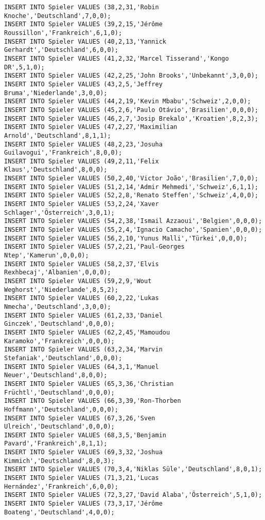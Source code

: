 \documentclass{bschlangaul-aufgabe}
\begin{document}
\begin{verbatim}
INSERT INTO Spieler VALUES (38,2,31,'Robin Knoche','Deutschland',7,0,0);
INSERT INTO Spieler VALUES (39,2,15,'Jérôme Roussillon','Frankreich',6,1,0);
INSERT INTO Spieler VALUES (40,2,13,'Yannick Gerhardt','Deutschland',6,0,0);
INSERT INTO Spieler VALUES (41,2,32,'Marcel Tisserand','Kongo DR',5,1,0);
INSERT INTO Spieler VALUES (42,2,25,'John Brooks','Unbekannt',3,0,0);
INSERT INTO Spieler VALUES (43,2,5,'Jeffrey Bruma','Niederlande',3,0,0);
INSERT INTO Spieler VALUES (44,2,19,'Kevin Mbabu','Schweiz',2,0,0);
INSERT INTO Spieler VALUES (45,2,6,'Paulo Otávio','Brasilien',0,0,0);
INSERT INTO Spieler VALUES (46,2,7,'Josip Brekalo','Kroatien',8,2,3);
INSERT INTO Spieler VALUES (47,2,27,'Maximilian Arnold','Deutschland',8,1,1);
INSERT INTO Spieler VALUES (48,2,23,'Josuha Guilavogui','Frankreich',8,0,0);
INSERT INTO Spieler VALUES (49,2,11,'Felix Klaus','Deutschland',8,0,0);
INSERT INTO Spieler VALUES (50,2,40,'Victor João','Brasilien',7,0,0);
INSERT INTO Spieler VALUES (51,2,14,'Admir Mehmedi','Schweiz',6,1,1);
INSERT INTO Spieler VALUES (52,2,8,'Renato Steffen','Schweiz',4,0,0);
INSERT INTO Spieler VALUES (53,2,24,'Xaver Schlager','Österreich',3,0,1);
INSERT INTO Spieler VALUES (54,2,38,'Ismail Azzaoui','Belgien',0,0,0);
INSERT INTO Spieler VALUES (55,2,4,'Ignacio Camacho','Spanien',0,0,0);
INSERT INTO Spieler VALUES (56,2,10,'Yunus Malli','Türkei',0,0,0);
INSERT INTO Spieler VALUES (57,2,21,'Paul-Georges Ntep','Kamerun',0,0,0);
INSERT INTO Spieler VALUES (58,2,37,'Elvis Rexhbecaj','Albanien',0,0,0);
INSERT INTO Spieler VALUES (59,2,9,'Wout Weghorst','Niederlande',8,5,2);
INSERT INTO Spieler VALUES (60,2,22,'Lukas Nmecha','Deutschland',3,0,0);
INSERT INTO Spieler VALUES (61,2,33,'Daniel Ginczek','Deutschland',0,0,0);
INSERT INTO Spieler VALUES (62,2,45,'Mamoudou Karamoko','Frankreich',0,0,0);
INSERT INTO Spieler VALUES (63,2,34,'Marvin Stefaniak','Deutschland',0,0,0);
INSERT INTO Spieler VALUES (64,3,1,'Manuel Neuer','Deutschland',8,0,0);
INSERT INTO Spieler VALUES (65,3,36,'Christian Früchtl','Deutschland',0,0,0);
INSERT INTO Spieler VALUES (66,3,39,'Ron-Thorben Hoffmann','Deutschland',0,0,0);
INSERT INTO Spieler VALUES (67,3,26,'Sven Ulreich','Deutschland',0,0,0);
INSERT INTO Spieler VALUES (68,3,5,'Benjamin Pavard','Frankreich',8,1,1);
INSERT INTO Spieler VALUES (69,3,32,'Joshua Kimmich','Deutschland',8,0,3);
INSERT INTO Spieler VALUES (70,3,4,'Niklas Süle','Deutschland',8,0,1);
INSERT INTO Spieler VALUES (71,3,21,'Lucas Hernández','Frankreich',6,0,0);
INSERT INTO Spieler VALUES (72,3,27,'David Alaba','Österreich',5,1,0);
INSERT INTO Spieler VALUES (73,3,17,'Jérôme Boateng','Deutschland',4,0,0);

\end{verbatim}
\end{document}

